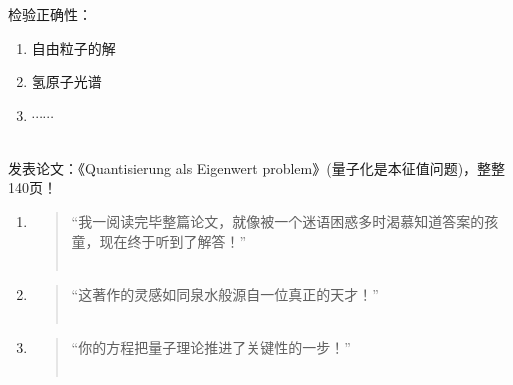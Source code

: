 \begin{frame}
    \frametitle{}
    检验正确性：
    \begin{enumerate}
        \item 自由粒子的解
        \item 氢原子光谱
        \item $\cdots \cdots$
    \end{enumerate}
    ~\\ 
    发表论文：《Quantisierung als Eigenwert problem》(量子化是本征值问题)，整整140页！
\end{frame}

\begin{frame}
    \begin{enumerate}
        \item 
        \begin{quote}
            “我一阅读完毕整篇论文，就像被一个迷语困惑多时渴慕知道答案的孩童，现在终于听到了解答！” \\
            ~~\\
        \end{quote}  
        \item 
        \begin{quote}
            “这著作的灵感如同泉水般源自一位真正的天才！” \\
            ~~\\
        \end{quote}  
        \item  
        \begin{quote}
            “你的方程把量子理论推进了关键性的一步！” \\
            ~~\\
        \end{quote} 
    \end{enumerate}
\end{frame}

